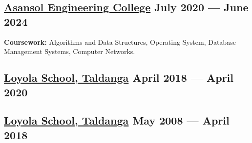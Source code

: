 





\subsection{{\href{https://www.aecwb.edu.in}{Asansol Engineering College} \hfill July 2020 --- June 2024}}

\vspace{0.25em}
\subtext{}\textbf{Coursework:} Algorithms and Data Structures, Operating System, Database Management Systems, Computer Networks.
\vspace{0.2em}
\begin{null}
\end{null}

\subsection{{\href{https://www.loyolataldanga.com/}{Loyola School, Taldanga} \hfill April 2018 --- April 2020}}
\begin{null}

\end{null}

\subsection{{\href{https://www.loyolataldanga.com/}{Loyola School, Taldanga} \hfill May 2008 --- April 2018}}
\begin{null}

\end{null}